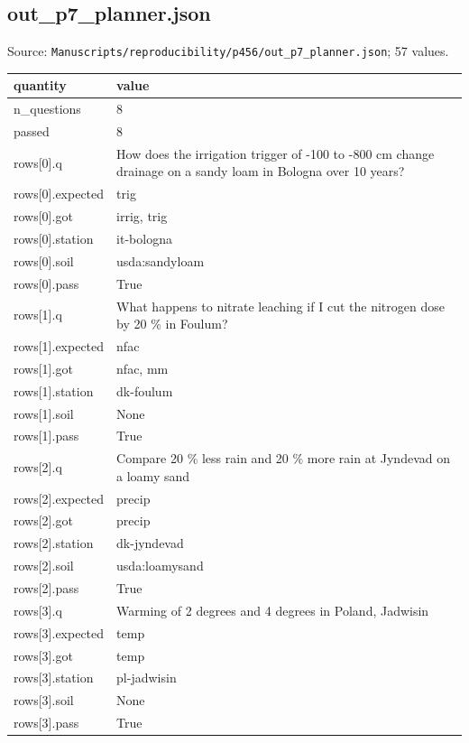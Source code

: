 \subsection*{out\_p7\_planner.json}
\noindent\small Source: \nolinkurl{Manuscripts/reproducibility/p456/out_p7_planner.json}; 57 values.\par
{\scriptsize\begin{longtable}{p{}p{}}\toprule\textbf{quantity} & \textbf{value}\\\midrule\endhead
{}n\_questions & 8\\
{}passed & 8\\
{}rows[0].q & How does the irrigation trigger of -100 to -800 cm change drainage on a sandy loam in Bologna over 10 years?\\
{}rows[0].expected & trig\\
{}rows[0].got & irrig, trig\\
{}rows[0].station & it-bologna\\
{}rows[0].soil & usda:sandyloam\\
{}rows[0].pass & True\\
{}rows[1].q & What happens to nitrate leaching if I cut the nitrogen dose by 20 \% in Foulum?\\
{}rows[1].expected & nfac\\
{}rows[1].got & nfac, mm\\
{}rows[1].station & dk-foulum\\
{}rows[1].soil & None\\
{}rows[1].pass & True\\
{}rows[2].q & Compare 20 \% less rain and 20 \% more rain at Jyndevad on a loamy sand\\
{}rows[2].expected & precip\\
{}rows[2].got & precip\\
{}rows[2].station & dk-jyndevad\\
{}rows[2].soil & usda:loamysand\\
{}rows[2].pass & True\\
{}rows[3].q & Warming of 2 degrees and 4 degrees in Poland, Jadwisin\\
{}rows[3].expected & temp\\
{}rows[3].got & temp\\
{}rows[3].station & pl-jadwisin\\
{}rows[3].soil & None\\
{}rows[3].pass & True\\

\end{longtable}}
